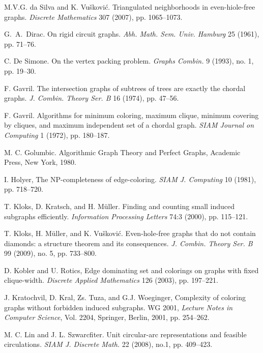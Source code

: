 \documentclass[11pt,a4paper]{article}
\begin{document}
\begin{thebibliography}{99}
M.V.G. da Silva and K. Vu\v{s}kovi\'c.
Triangulated neighborhoods in even-hiole-free graphs.
{\it Discrete Mathematics} 307 (2007), pp. 1065--1073.

G.~A.~Dirac.  On rigid circuit graphs. {\it Abh. Math. Sem. Univ.
Hamburg} 25 (1961), pp. 71--76.

C. De Simone. On the vertex packing problem. {\it Graphs Combin.}
9 (1993), no. 1, pp. 19--30.

F. Gavril. The intersection graphs of subtrees of trees are
exactly the chordal graphs. {\it J. Combin. Theory
Ser. B} 16 (1974), pp. 47--56.

F. Gavril. Algorithms for minimum coloring, maximum clique,
minimum covering by cliques, and maximum independent set of a
chordal graph. {\it SIAM Journal on Computing} 1 (1972), pp.
180--187.

M. C. Golumbic.
Algorithmic Graph Theory and Perfect Graphs,
Academic Press, New York, 1980.



I. Holyer, The NP-completeness of edge-coloring. {\it SIAM J.
Computing} 10 (1981), pp. 718--720.



T. Kloks, D. Kratsch, and H. M\"uller.
Finding and counting small induced subgraphs efficiently.
{\it Information Processing Letters}
74:3 (2000), pp. 115--121.

T. Kloks, H. M\"uller, and  K. Vu\v{s}kovi\'c.
Even-hole-free graphs that do not contain diamonds: a structure
theorem and its consequences. {\it J. Combin. Theory Ser. B} 99
(2009), no. 5, pp. 733--800.

D. Kobler and U. Rotics, Edge dominating set and colorings on
graphs with fixed clique-width.  {\it Discrete Applied
Mathematics} 126 (2003), pp. 197--221.

J. Kratochvil, D. Kral, Zs. Tuza, and  G.J. Woeginger, Complexity
of coloring graphs without forbidden induced subgraphs. WG 2001,
{\it Lecture Notes in Computer Science}, Vol. 2204, Springer,
Berlin, 2001, pp. 254--262.



M. C. Lin and J. L. Szwarcfiter. Unit circular-arc representations and feasible circulations.
{\it SIAM J. Discrete Math.} 22 (2008), no.1,  pp. 409--423.


\end{thebibliography}
\end{document}
